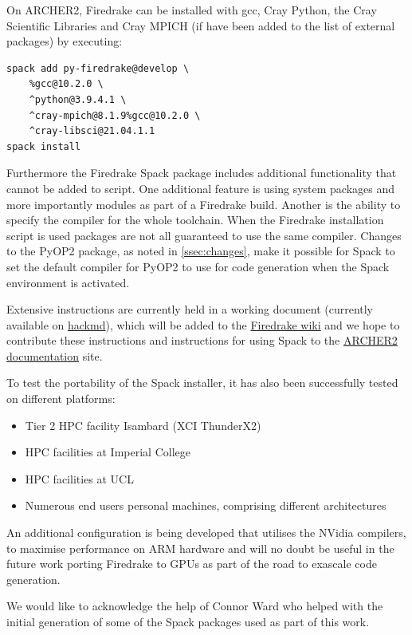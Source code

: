 \documentclass[a4paper,11pt]{article}
\begin{document}
On ARCHER2, Firedrake can be installed with gcc, Cray Python, the Cray Scientific Libraries and Cray MPICH (if have been added to the list of external packages) by executing:
\begin{lstlisting}
spack add py-firedrake@develop \
    %gcc@10.2.0 \
    ^python@3.9.4.1 \
    ^cray-mpich@8.1.9%gcc@10.2.0 \
    ^cray-libsci@21.04.1.1
spack install
\end{lstlisting}

Furthermore the Firedrake Spack package includes additional functionality that cannot be added to script.
One additional feature is using system packages and more importantly modules as part of a Firedrake build.
Another is the ability to specify the compiler for the whole toolchain.
When the Firedrake installation script is used packages are not all guaranteed to use the same compiler.
Changes to the PyOP2 package, as noted in \cref{ssec:changes}, make it possible for Spack to set the default compiler for PyOP2 to use for code generation when the Spack environment is activated.

Extensive instructions are currently held in a working document (currently available on \href{https://hackmd.io/Sg3fYXuCTl61d_LAg4QnMw}{hackmd}), which will be added to the \href{https://github.com/firedrakeproject/firedrake/wiki}{Firedrake wiki} and we hope to contribute these instructions and instructions for using Spack to the \href{https://docs.archer2.ac.uk/}{ARCHER2 documentation} site.

To test the portability of the Spack installer, it has also been successfully tested on different platforms:
\begin{itemize}[topsep=2pt, partopsep=0pt, itemsep=1pt, parsep=1pt]
	\item Tier 2 HPC facility Isambard (XCI ThunderX2)
	\item HPC facilities at Imperial College
	\item HPC facilities at UCL
	\item Numerous end users personal machines, comprising different architectures
\end{itemize} 
An additional configuration is being developed that utilises the NVidia compilers, to maximise performance on ARM hardware and will no doubt be useful in the future work porting Firedrake to GPUs as part of the road to exascale code generation.

We would like to acknowledge the help of Connor Ward who helped with the initial generation of some of the Spack packages used as part of this work.
\end{document}
